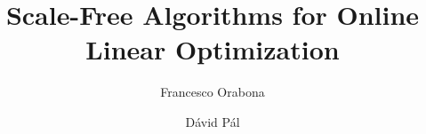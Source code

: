 \documentclass{elsarticle}
\begin{document}
\begin{frontmatter}

\title{Scale-Free Algorithms for Online Linear Optimization}


\author{Francesco Orabona}

\author{D\'avid P\'al}

\address{Yahoo Labs, 11th Floor, 229 West 43rd Street, New York, NY 10036, USA}

\begin{abstract}

\end{abstract}

\end{frontmatter}









{\small


}

\appendix






\end{document}

